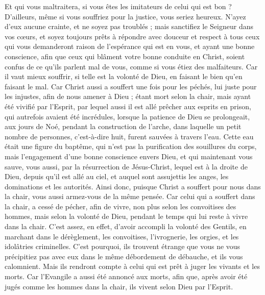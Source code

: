 \begin{multicols}{2}
Et qui vous maltraitera, si vous êtes les imitateurs de celui qui est bon ?
D'ailleurs, même si vous souffriez pour la justice, vous seriez heureux. N'ayez d'eux aucune crainte, et ne soyez pas troublés ;
mais sanctifiez le Seigneur dans vos cœurs, et soyez toujours prêts à répondre avec douceur et respect à tous ceux qui vous demanderont raison de l'espérance qui est en vous,
et ayant une bonne conscience, afin que ceux qui blâment votre bonne conduite en Christ, soient confus de ce qu'ils parlent mal de vous, comme si vous étiez des malfaiteurs.
Car il vaut mieux souffrir, si telle est la volonté de Dieu, en faisant le bien qu'en faisant le mal.
Car Christ aussi a souffert une fois pour les péchés, lui juste pour les injustes, afin de nous amener à Dieu ; étant mort selon la chair, mais ayant été vivifié par l'Esprit,
par lequel aussi il est allé prêcher aux esprits en prison,
qui autrefois avaient été incrédules, lorsque la patience de Dieu se prolongeait, aux jours de Noé, pendant la construction de l'arche, dans laquelle un petit nombre de personnes, c'est-à-dire huit, furent sauvées à travers l'eau.
Cette eau était une figure du baptême, qui n'est pas la purification des souillures du corps, mais l'engagement d'une bonne conscience envers Dieu, et qui maintenant vous sauve, vous aussi, par la résurrection de Jésus-Christ,
lequel est à la droite de Dieu, depuis qu'il est allé au ciel, et auquel sont assujettis les anges, les dominations et les autorités.
\VerseOne{}Ainsi donc, puisque Christ a souffert pour nous dans la chair, vous aussi armez-vous de la même pensée. Car celui qui a souffert dans la chair, a cessé de pécher,
afin de vivre, non plus selon les convoitises des hommes, mais selon la volonté de Dieu, pendant le temps qui lui reste à vivre dans la chair.
C'est assez, en effet, d'avoir accompli la volonté des Gentils, en marchant dans le dérèglement, les convoitises, l'ivrognerie, les orgies, et les idolâtries criminelles.
C'est pourquoi, ils trouvent étrange que vous ne vous précipitiez pas avec eux dans le même débordement de débauche, et ils vous calomnient.
Mais ils rendront compte à celui qui est prêt à juger les vivants et les morts.
Car l'Evangile a aussi été annoncé aux morts, afin que, après avoir été jugés comme les hommes dans la chair, ils vivent selon Dieu par l'Esprit.

\end{multicols}
